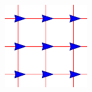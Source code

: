 \begin{columns}[T] %
  \begin{column}{.45\textwidth}
    
  \end{column}%
  \begin{column}{.45\textwidth}
    \begin{figure}
      \centering
      \includegraphics[width=0.5\columnwidth]{figs/squarelattice}
    \end{figure}
  \end{column}%
\end{columns}